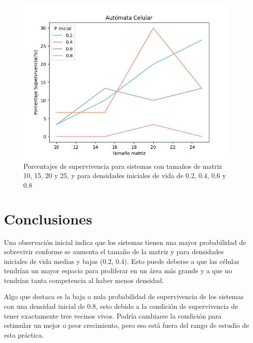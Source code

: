 \documentclass{article}
\begin{document}
\begin{figure}[h]
    \centering
    \includegraphics[width=140mm]{CellularAutomata.png}
    \caption{Porcentajes de supervivencia para sistemas con tamaños de matriz 10, 15, 20 y 25, y para densidades iniciales de vida de 0.2, 0.4, 0.6 y 0.8}
    \label{figura1}
\end{figure}

\section{Conclusiones}
Una observaci\'on inicial indica que los sistemas tienen una mayor probabilidad de sobrevivir conforme se aumenta el tamaño de la matriz y para densidades iniciales de vida medias y bajas (0.2, 0.4). Esto puede deberse a que las c\'elulas tendr\'ian un mayor espacio para proliferar en un \'area m\'as grande y a que no tendr\'ian tanta competencia al haber menos densidad.

Algo que destaca es la baja o nula probabilidad de supervivencia de los sistemas con una densidad inicial de 0.8, esto debido a la condici\'on de supervivencia de tener exactamente tres vecinos vivos. Podr\'ia cambiarse la condici\'on para estimular un mejor o peor crecimiento, pero eso est\'a fuera del rango de estudio de esta pr\'actica.



\end{document}
